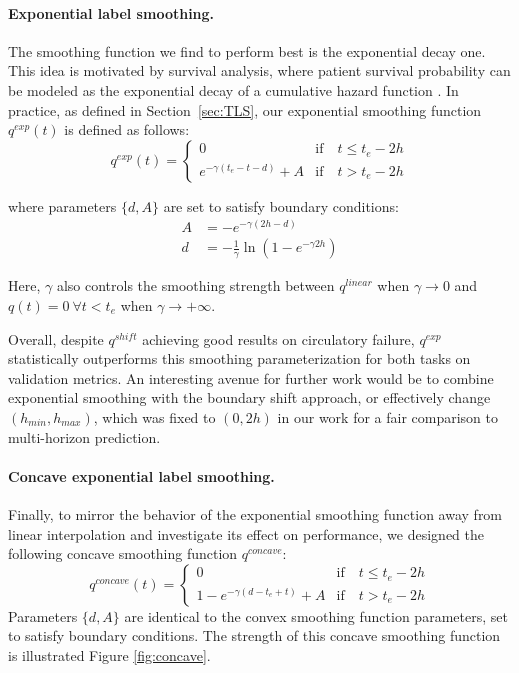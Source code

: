 \documentclass[nohyperref]{article}
\begin{document}
\paragraph{Exponential label smoothing.}
The smoothing function we find to perform best is the exponential decay one. This idea is motivated by survival analysis, where patient survival probability can be modeled as the exponential decay of a cumulative hazard function \cite{cox1972, collett2015modelling}. In practice, as defined in Section~\ref{sec:TLS}, our exponential smoothing function $ q^{exp}( t)$ is defined as follows:
\begin{equation}
    q^{exp}( t)  = \begin{cases}
    0 & \mathrm{if} \quad t \leq  t_e - 2h \\
    e^{ - \gamma ( t_e - t - d) } + A  & \mathrm{if} \quad t > t_e - 2h 
    \end{cases}
\end{equation}

where parameters $\{d, A\}$ are set to satisfy boundary conditions:
\begin{align*}
    A &=  - e^{- \gamma(2h - d)} \\
    d &=  - \frac{1}{\gamma} \ln \left(1 - e^{-\gamma 2h} \right) 
\end{align*}

Here, $\gamma$ also controls the smoothing strength between $q^{linear}$ when $\gamma \rightarrow 0$ and $q(t)=0 \: \forall t < t_e $ when $\gamma \rightarrow +\infty$.

{Overall, despite $q^{shift}$ achieving good results on circulatory failure, $q^{exp}$ statistically outperforms this smoothing parameterization for both tasks on validation metrics. An interesting avenue for further work would be to combine exponential smoothing with the boundary shift approach, or effectively change $(h_{min}, h_{max})$, which was fixed to $(0,2h)$ in our work for a fair comparison to multi-horizon prediction.}




\paragraph{Concave exponential label smoothing.}

Finally, to mirror the behavior of the exponential smoothing function away from linear interpolation and investigate its effect on performance, we designed the following concave smoothing function $q^{concave}$:
\begin{equation}
    q^{concave}( t)  =  
    \begin{cases}
    0 & \mathrm{if} \quad t \leq  t_e - 2h \\
    1 - e^{ - \gamma (d - t_e + t) } + A & \mathrm{if} \quad t > t_e - 2h
    \end{cases}
\end{equation}
Parameters $\{d, A\}$ are identical to the convex smoothing function parameters, set to satisfy boundary conditions. The strength of this concave smoothing function is illustrated Figure \ref{fig:concave}.
\end{document}

